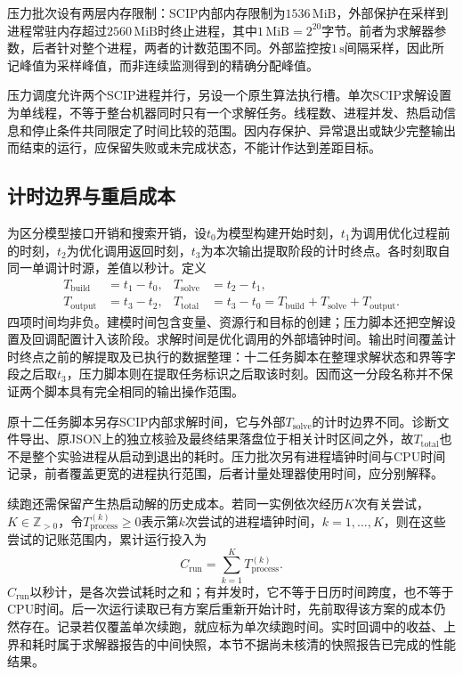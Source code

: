 压力批次设有两层内存限制：SCIP内部内存限制为$1536\,\mathrm{MiB}$，外部保护在采样到进程常驻内存超过$2560\,\mathrm{MiB}$时终止进程，其中$1\,\mathrm{MiB}=2^{20}$字节。前者为求解器参数，后者针对整个进程，两者的计数范围不同。外部监控按$1\,\mathrm{s}$间隔采样，因此所记峰值为采样峰值，而非连续监测得到的精确分配峰值。

压力调度允许两个SCIP进程并行，另设一个原生算法执行槽。单次SCIP求解设置为单线程，不等于整台机器同时只有一个求解任务。线程数、进程并发、热启动信息和停止条件共同限定了时间比较的范围。因内存保护、异常退出或缺少完整输出而结束的运行，应保留失败或未完成状态，不能计作达到差距目标。

\subsection{计时边界与重启成本}

为区分模型接口开销和搜索开销，设$t_0$为模型构建开始时刻，$t_1$为调用优化过程前的时刻，$t_2$为优化调用返回时刻，$t_3$为本次输出提取阶段的计时终点。各时刻取自同一单调计时源，差值以秒计。定义
\begin{align}
 T_{\mathrm{build}}&=t_1-t_0,
 &T_{\mathrm{solve}}&=t_2-t_1,
 \label{s0301:timing_build_solve}\\
 T_{\mathrm{output}}&=t_3-t_2,
 &T_{\mathrm{total}}&=t_3-t_0
 =T_{\mathrm{build}}+T_{\mathrm{solve}}+T_{\mathrm{output}}.
 \label{s0301:timing_total}
\end{align}
四项时间均非负。建模时间包含变量、资源行和目标的创建；压力脚本还把空解设置及回调配置计入该阶段。求解时间是优化调用的外部墙钟时间。输出时间覆盖计时终点之前的解提取及已执行的数据整理：十二任务脚本在整理求解状态和界等字段之后取$t_3$，压力脚本则在提取任务标识之后取该时刻。因而这一分段名称并不保证两个脚本具有完全相同的输出操作范围。

原十二任务脚本另存SCIP内部求解时间，它与外部$T_{\mathrm{solve}}$的计时边界不同。诊断文件导出、原JSON上的独立核验及最终结果落盘位于相关计时区间之外，故$T_{\mathrm{total}}$也不是整个实验进程从启动到退出的耗时。压力批次另有进程墙钟时间与CPU时间记录，前者覆盖更宽的进程执行范围，后者计量处理器使用时间，应分别解释。

续跑还需保留产生热启动解的历史成本。若同一实例依次经历$K$次有关尝试，$K\in\mathbb{Z}_{>0}$，令$T_{\mathrm{process}}^{(k)}\geq0$表示第$k$次尝试的进程墙钟时间，$k=1,\ldots,K$，则在这些尝试的记账范围内，累计运行投入为
\begin{equation}
 C_{\mathrm{run}}=\sum_{k=1}^{K}T_{\mathrm{process}}^{(k)}.
\label{s0301:restart_accounting}
\end{equation}
$C_{\mathrm{run}}$以秒计，是各次尝试耗时之和；有并发时，它不等于日历时间跨度，也不等于CPU时间。后一次运行读取已有方案后重新开始计时，先前取得该方案的成本仍然存在。记录若仅覆盖单次续跑，就应标为单次续跑时间。实时回调中的收益、上界和耗时属于求解器报告的中间快照，本节不据尚未核清的快照报告已完成的性能结果。

